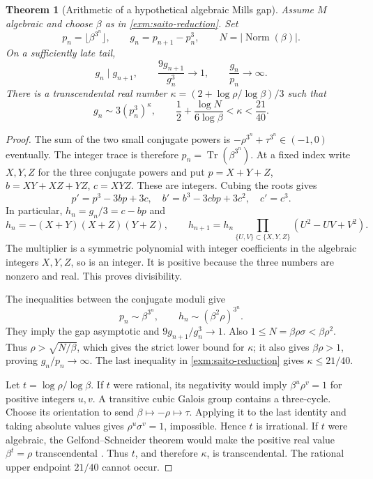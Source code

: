 \documentclass[11pt,a4paper]{article}
\numberwithin{equation}{section}
\newtheorem{theorem}{Theorem}[section]
\theoremstyle{definition}
\theoremstyle{remark}
\begin{document}
\begin{theorem}[Arithmetic of a hypothetical algebraic Mills gap]
\label{exm:gap}
Assume \(M\) algebraic and choose \(\beta\) as in
\eqref{exm:saito-reduction}. Set
\[
 p_n=\lfloor\beta^{3^n}\rfloor,\qquad
 g_n=p_{n+1}-p_n^3,\qquad N=|\operatorname{Norm}(\beta)|.
\]
On a sufficiently late tail,
\[
 g_n\mid g_{n+1},\qquad
 \frac{9g_{n+1}}{g_n^3}\longrightarrow1,\qquad
 \frac{g_n}{p_n}\longrightarrow\infty.
\]
There is a transcendental real number
\(\kappa=(2+\log\rho/\log\beta)/3\) such that
\begin{equation}\label{exm:gap-asymptotic}
 g_n\sim3(p_n^3)^\kappa,\qquad
 \frac12+\frac{\log N}{6\log\beta}
 <\kappa<\frac{21}{40}.
\end{equation}
\end{theorem}

\begin{proof}
The sum of the two small conjugate powers is
\(-\rho^{3^n}+\tau^{3^n}\in(-1,0)\) eventually. The integer
trace is therefore \(p_n=\operatorname{Tr}(\beta^{3^n})\).
At a fixed index write \(X,Y,Z\) for the three conjugate powers
and put \(p=X+Y+Z\), \(b=XY+XZ+YZ\), \(c=XYZ\).
These are integers. Cubing the roots gives
\[
 p'=p^3-3bp+3c,\quad
 b'=b^3-3cbp+3c^2,\quad c'=c^3.
\]
In particular, \(h_n=g_n/3=c-bp\) and
\[
 h_n=-(X+Y)(X+Z)(Y+Z),\qquad
 h_{n+1}=h_n
 \prod_{\{U,V\}\subset\{X,Y,Z\}}(U^2-UV+V^2).
\]
The multiplier is a symmetric polynomial with integer coefficients
in the algebraic integers \(X,Y,Z\), so is an integer.
It is positive because the three numbers are nonzero and real.
This proves divisibility.

The inequalities between the conjugate moduli give
\[
 p_n\sim\beta^{3^n},\qquad
 h_n\sim(\beta^2\rho)^{3^n}.
\]
They imply the gap asymptotic and
\(9g_{n+1}/g_n^3\to1\). Also
\(1\le N=\beta\rho\sigma<\beta\rho^2\).
Thus \(\rho>\sqrt{N/\beta}\), which gives the strict lower bound
for \(\kappa\); it also gives \(\beta\rho>1\), proving
\(g_n/p_n\to\infty\). The last inequality in
\eqref{exm:saito-reduction} gives \(\kappa\le21/40\).

Let \(t=\log\rho/\log\beta\). If \(t\) were rational, its
negativity would imply \(\beta^u\rho^v=1\) for positive
integers \(u,v\). A transitive cubic Galois group contains a
three-cycle. Choose its orientation to send
\(\beta\mapsto-\rho\mapsto\tau\). Applying it to the last
identity and taking absolute values gives
\(\rho^u\sigma^v=1\), impossible. Hence \(t\) is irrational.
If \(t\) were algebraic, the Gelfond--Schneider
theorem would make the positive real value
\(\beta^t=\rho\) transcendental \cite{Schneider1934}.
Thus \(t\), and therefore \(\kappa\), is transcendental.
The rational upper endpoint \(21/40\) cannot occur.
\end{proof}
\end{document}
